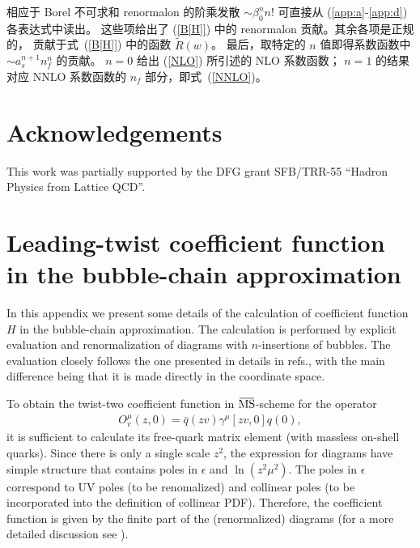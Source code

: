 相应于 Borel 不可求和 renormalon 的阶乘发散 $\sim \beta_0^n  n!$
可直接从 (\ref{app:a}-\ref{app:d}) 各表达式中读出。
这些项给出了 (\ref{B[H]}) 中的 renormalon 贡献。其余各项是正规的，
贡献于式~(\ref{B[H]}) 中的函数 $\widetilde R(w)$。
最后，取特定的 $n$ 值即得系数函数中 $\sim a_s^{n+1}n_f^n$ 的贡献。
$n=0$ 给出 (\ref{NLO}) 所引述的 NLO 系数函数；
$n=1$ 的结果对应 NNLO 系数函数的 $n_f$ 部分，即式~(\ref{NNLO})。

%

\section*{Acknowledgements}

This  work  was  partially  supported  by  the  DFG grant SFB/TRR-55 ``Hadron Physics from Lattice QCD''.



\appendix 


%
\section{Leading-twist coefficient function in the bubble-chain approximation}
\label{App:H} 
%

In this appendix we present some details of the calculation of coefficient function $H$ in the bubble-chain approximation. The calculation is performed by explicit evaluation and renormalization of diagrams with $n$-insertions of bubbles. The evaluation closely follows the one presented in details in refs.\cite{Beneke:1995pq,Scimemi:2016ffw}, with the main difference being that it is made directly in the coordinate space.

To obtain the twist-two coefficient function in $\MSbar$-scheme for the operator
\begin{eqnarray}
O_v^\mu(z,0)=\bar q(z v)\gamma^\mu [zv,0]q(0),
\end{eqnarray}
it is sufficient to calculate its free-quark matrix element (with massless on-shell quarks). Since there is only a single scale $z^2$, the expression for diagrams have simple structure that contains poles in $\epsilon$ and $\ln(z^2\mu^2)$. The poles in $\epsilon$ correspond to UV poles (to be renomalized) and collinear poles (to be incorporated into the definition of collinear PDF). Therefore, the coefficient function is given by the finite part of the (renormalized) diagrams (for a more detailed discussion see \cite{Echevarria:2016scs,Scimemi:2016ffw}).

